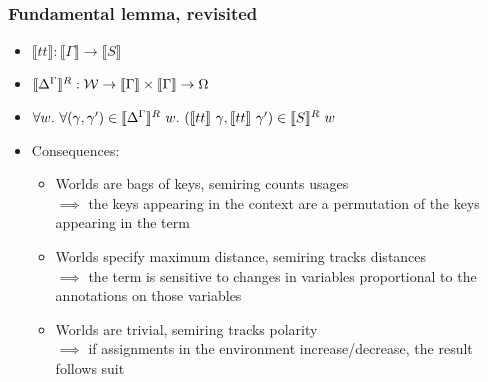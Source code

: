\documentclass{beamer}
\begin{document}
  \begin{frame}
    \frametitle{Fundamental lemma, revisited}
    \begin{itemize}
    \item $\llbracket tt \rrbracket : \llbracket \Gamma \rrbracket \to
      \llbracket S \rrbracket$
    \item $\llbracket {\Delta}^{\Gamma} \rrbracket^R : \mathcal{W} \to
      \llbracket \Gamma \rrbracket \times \llbracket \Gamma \rrbracket \to \Omega$
    \item $\forall w.~\forall(\gamma, \gamma') \in \llbracket {\Delta}^{\Gamma}
      \rrbracket^R~w.~(\llbracket tt \rrbracket~\gamma, \llbracket tt
      \rrbracket~\gamma') \in \llbracket S \rrbracket^R~w$
    \item Consequences:
      \begin{itemize}
      \item Worlds are bags of keys, semiring counts usages \\
        $\implies$ the keys appearing in the context are a permutation of the
        keys appearing in the term
      \item Worlds specify maximum distance, semiring tracks distances \\
        $\implies$ the term is sensitive to changes in variables proportional to
        the annotations on those variables
      \item Worlds are trivial, semiring tracks polarity \\
        $\implies$ if assignments in the environment increase/decrease, the
        result follows suit
      \end{itemize}
    \end{itemize}
  \end{frame}
\end{document}

